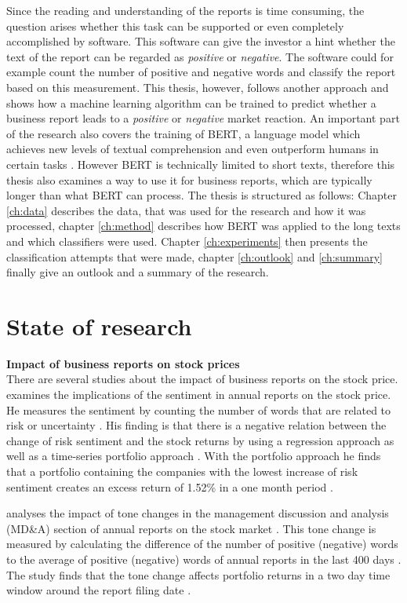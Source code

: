 Since the reading and understanding of the reports is time consuming, the question arises whether this task can be supported or even completely accomplished by software.
This software can give the investor a hint whether the text of the report can be regarded as \textit{positive} or \textit{negative}.
The software could for example count the number of positive and negative words and classify the report based on this measurement.
This thesis, however, follows another approach and shows how a machine learning algorithm can be trained to predict whether a business report leads to a \textit{positive} or \textit{negative} market reaction.
An important part of the research also covers the training of \acs{BERT}, a language model which achieves new levels of textual comprehension and even outperform humans in certain tasks \cite[p. 7]{Devlin2018}.
However \acs{BERT} is technically limited to short texts, therefore this thesis also examines a way to use it for business reports, which are typically longer than what \acs{BERT} can process.
The thesis is structured as follows:
Chapter \ref{ch:data} describes the data, that was used for the research and how it was processed, chapter \ref{ch:method} describes how \acs{BERT} was applied to the long texts and which classifiers were used.
Chapter \ref{ch:experiments} then presents the classification attempts that were made, chapter \ref{ch:outlook} and \ref{ch:summary} finally give an outlook and a summary of the research.
\section{State of research}
\textbf{Impact of business reports on stock prices} \\
There are several studies about the impact of business reports on the stock price.
\cite{Li2006} examines the implications of the sentiment in annual reports on the stock price.
He measures the sentiment by counting the number of words that are related to risk or uncertainty \cite[p. 4]{Li2006}.
His finding is that there is a negative relation between the change of risk sentiment and the stock returns by using a regression approach as well as a time-series portfolio approach \cite[p. 14]{Li2006}.
With the portfolio approach he finds that a portfolio containing the companies with the lowest increase of risk sentiment creates an excess return of 1.52\% in a one month period \cite[p. 16]{Li2006}.

\cite{Feldman2010} analyses the impact of tone changes in the management discussion and analysis (MD\&A) section of annual reports on the stock market \cite[p. 918]{Feldman2010}.
This tone change is measured by calculating the difference of the number of positive (negative) words to the average of positive (negative) words of annual reports in the last 400 days \cite[p. 927]{Feldman2010}.
The study finds that the tone change affects portfolio returns in a two day time window around the report filing date \cite[pp. 935-936]{Feldman2010}.

